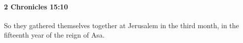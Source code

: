 
		\paragraph{2 Chronicles 15:10} %
			\label{2CHRONICLES-15-10}

			So they gathered themselves together at Jerusalem in the third month, in the fifteenth year of the reign of Asa.


